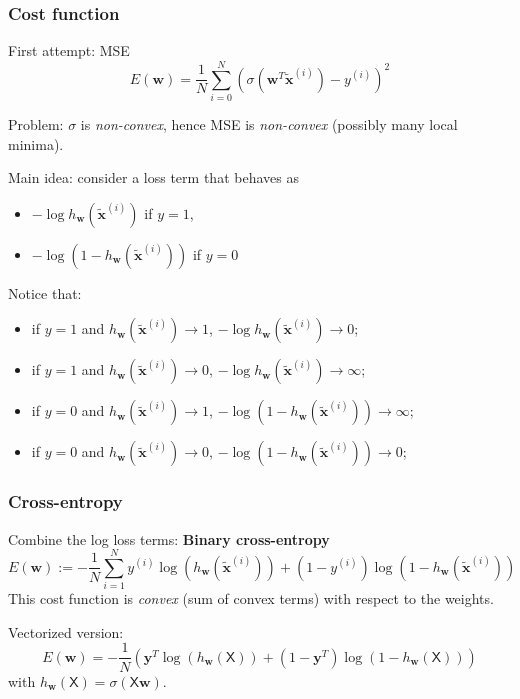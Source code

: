 \documentclass{beamer}
\begin{document}
	\begin{frame}
		\frametitle{Cost function}
		
		First attempt: MSE
		\begin{equation*}
			E(\bm{w}) = \frac{1}{N} \sum_{i= 0}^{N} (\sigma(\bm{w}^T\tilde{\bm{x}}^{(i)}) - y^{(i)})^2
		\end{equation*}
		
		Problem: $\sigma$ is \textsl{non-convex}, hence MSE is \textsl{non-convex} (possibly many local minima).
		
		\vspace{5mm}
		
		Main idea: consider a loss term that behaves as
		\begin{itemize}
			\item $-\log h_{\bm{w}}(\tilde{\bm{x}}^{(i)})$ if $y=1$, 
			\item $-\log (1-h_{\bm{w}}(\tilde{\bm{x}}^{(i)}))$ if $y=0$
		\end{itemize}
		
		Notice that:
		\begin{itemize}
			\item if $y=1$ and $h_{\bm{w}}(\tilde{\bm{x}}^{(i)}) \rightarrow 1$, $-\log h_{\bm{w}}(\tilde{\bm{x}}^{(i)}) \rightarrow 0$;
			\item if $y=1$ and $h_{\bm{w}}(\tilde{\bm{x}}^{(i)}) \rightarrow 0$, $-\log h_{\bm{w}}(\tilde{\bm{x}}^{(i)}) \rightarrow \infty$;
			\item if $y=0$ and $h_{\bm{w}}(\tilde{\bm{x}}^{(i)}) \rightarrow 1$, $-\log (1-h_{\bm{w}}(\tilde{\bm{x}}^{(i)})) \rightarrow \infty$;
			\item if $y=0$ and $h_{\bm{w}}(\tilde{\bm{x}}^{(i)}) \rightarrow 0$, $-\log (1-h_{\bm{w}}(\tilde{\bm{x}}^{(i)})) \rightarrow 0$;
		\end{itemize}

	\end{frame}
	
	\begin{frame}
		\frametitle{Cross-entropy}
		Combine the log loss terms: \textbf{Binary cross-entropy}
		\begin{equation*}
			E(\bm{w}) := - \frac{1}{N} \sum_{i=1}^{N} y^{(i)}\log(h_{\bm{w}}(\tilde{\bm{x}}^{(i)})) + (1-y^{(i)})\log(1-h_{\bm{w}}(\tilde{\bm{x}}^{(i)}))
		\end{equation*}
		This cost function is \textit{convex} (sum of convex terms) with respect to the weights.
		
		\vspace{5mm}
		Vectorized version:
		\begin{equation*}
			E(\bm{w}) = - \frac{1}{N} \left(\bm{y}^T\log (h_{\bm{w}}(\mathsf{X})) + (1-\bm{y}^T)\log(1-h_{\bm{w}}(\mathsf{X}))\right)
		\end{equation*}
		with $h_{\bm{w}}(\mathsf{X}) = \sigma(\mathsf{X}\bm{w})$.
	\end{frame}
\end{document}
